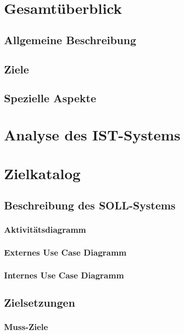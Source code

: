 \documentclass[12pt]{article}
\begin{document}
  \newpage


  \tableofcontents
  \newpage


  \section{Gesamtüberblick}
    \subsection{Allgemeine Beschreibung}
    \subsection{Ziele}
    \subsection{Spezielle Aspekte}


  \section{Analyse des IST-Systems}

  \section{Zielkatalog}
    \subsection{Beschreibung des SOLL-Systems}
      \subsubsection{Aktivitätsdiagramm}
      \subsubsection{Externes Use Case Diagramm}
      \subsubsection{Internes Use Case Diagramm}

    \subsection{Zielsetzungen}
      \subsubsection{Muss-Ziele}
\end{document}
